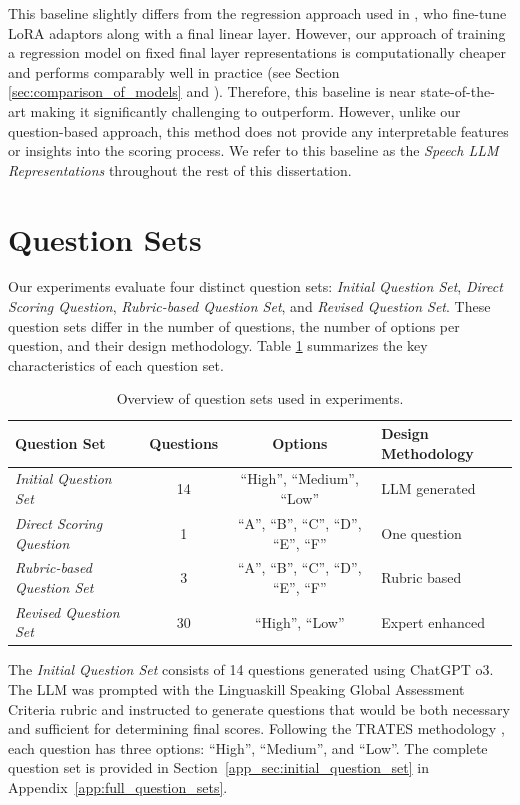 \documentclass{report}
\begin{document}
This baseline slightly differs from the regression approach used in \citet{ma2025assessment}, who fine-tune LoRA adaptors along with a final linear layer. However, our approach of training a regression model on fixed final layer representations is computationally cheaper and performs comparably well in practice (see Section \ref{sec:comparison_of_models} and \citet{ma2025assessment}). Therefore, this baseline is near state-of-the-art making it significantly challenging to outperform. However, unlike our question-based approach, this method does not provide any interpretable features or insights into the scoring process. We refer to this baseline as the \emph{Speech LLM Representations} throughout the rest of this dissertation.

\section{Question Sets}
\label{sec:question_sets}
Our experiments evaluate four distinct question sets: \emph{Initial Question Set}, \emph{Direct Scoring Question}, \emph{Rubric-based Question Set}, and \emph{Revised Question Set}. These question sets differ in the number of questions, the number of options per question, and their design methodology. Table \ref{table:question_sets} summarizes the key characteristics of each question set. 

\begin{table}[h]
\centering
\begin{tabular}{|l|c|c|l|}
\hline
\textbf{Question Set} & \textbf{Questions} & \textbf{Options} & \textbf{Design Methodology} \\
\hline
\emph{Initial Question Set} & 14 & ``High'', ``Medium'', ``Low'' & LLM generated \\
\hline
\emph{Direct Scoring Question} & 1 & ``A'', ``B'', ``C'', ``D'', ``E'', ``F'' & One question \\
\hline
\emph{Rubric-based Question Set} & 3 & ``A'', ``B'', ``C'', ``D'', ``E'', ``F'' & Rubric based \\
\hline
\emph{Revised Question Set} & 30 & ``High'', ``Low'' & Expert enhanced \\
\hline
\end{tabular}
\caption{Overview of question sets used in experiments.}
\label{table:question_sets}
\end{table}

The \emph{Initial Question Set} consists of 14 questions generated using ChatGPT o3. The LLM was prompted with the Linguaskill Speaking Global Assessment Criteria rubric \citep{cambridge2020linguaskill} and instructed to generate questions that would be both necessary and sufficient for determining final scores. Following the TRATES methodology \citep{eltanbouly2025tratestraitspecificrubricassistedcrossprompt}, each question has three options: ``High'', ``Medium'', and ``Low''. The complete question set is provided in Section~\ref{app_sec:initial_question_set} in Appendix~\ref{app:full_question_sets}.
\end{document}
